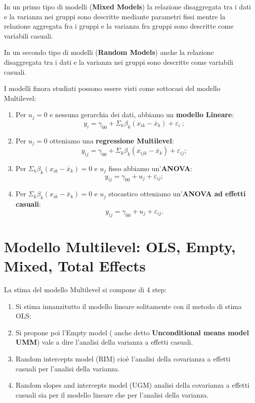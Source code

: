 \documentclass[a4page, 11pt]{article} %
\begin{document}
In un primo tipo di modelli (\textbf{Mixed Models}) la relazione disaggregata tra i dati e la varianza nei gruppi sono descritte mediante parametri fissi mentre la relazione aggregata fra i gruppi e la varianza fra gruppi sono descritte come variabili casuali.

In un secondo tipo di modelli (\textbf{Random Models}) anche la relazione disaggregata tra i dati e la varianza nei gruppi sono descritte come variabili casuali.

I modelli finora studiati possono essere visti come sottocasi del modello Multilevel:
\begin{enumerate}
\item Per $u_j=0$ e nessuna gerarchia dei dati, abbiamo un  \textbf{modello Lineare}: 
\begin{equation*}
y_i= \gamma_{00}+\Sigma_k \beta_k(x_{ik}-\bar{x}_k) + \varepsilon_i \ ;
\end{equation*}
\item Per $u_j=0$ otteniamo una \textbf{regressione Multilevel}: 
\begin{equation*}
y_{ij} = \gamma_{00} + \Sigma_k \beta_k(x_{ijk}-\bar{x}_k) + \varepsilon_{ij};
\end{equation*}
\item Per $\Sigma_k \beta_k (x_{ik} - \bar{x}_k) = 0$ e $u_j$ fisso abbiamo un'\textbf{ANOVA}: 
\begin{equation*}
y_{ij} = \gamma_{00}+ u_j + \varepsilon_{ij};
\end{equation*}
\item Per $\Sigma_k\beta_k(x_{ik}- \bar{x}_k) = 0$ e $u_j$ stocastico otteniamo un'\textbf{ANOVA ad effetti casuali}: 
\begin{equation*}
y_{ij} = \gamma_{00} + u_j + \varepsilon_{ij}.
\end{equation*}
\end{enumerate}
\section{Modello Multilevel: OLS, Empty, Mixed, Total Effects}

La stima del modello Multilevel si compone di 4 step:
\begin{enumerate}[noitemsep]
\item Si stima innanzitutto il modello lineare solitamente con il metodo di stima OLS;
\item Si propone poi l'Empty model ( anche detto \textbf{Unconditional means model UMM}) vale a dire l’analisi della varianza a effetti casuali.
\item Random intercepts model (RIM) cioè l’analisi della covarianza a effetti casuali per l’analisi della varianza.
\item Random slopes and intercepts model (UGM) analisi della covarianza a effetti casuali sia per il modello lineare che per l’analisi della varianza.
\end{enumerate}
\end{document}
